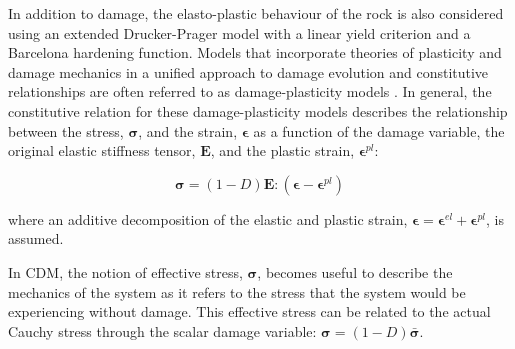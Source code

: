 In addition to damage, the elasto-plastic behaviour of the rock is also considered using an extended Drucker-Prager model with a linear yield criterion and a Barcelona hardening function. Models that incorporate theories of plasticity and damage mechanics in a unified approach to damage evolution and constitutive relationships are often referred to as damage-plasticity models \citep{zhang_continuum_2010}. In general, the constitutive relation for these damage-plasticity models describes the relationship between the stress, $\boldsymbol{\sigma}$, and the strain, $\boldsymbol{\epsilon}$ as a function of the damage variable, the original elastic stiffness tensor, $\mathbf{E}$, and the plastic strain, $\boldsymbol{\epsilon}^{pl}$: 

\begin{equation}
\boldsymbol{\sigma}=\left(1-D\right)\mathbf{E}:\left(\boldsymbol{\epsilon}-\boldsymbol{\epsilon}^{pl}\right)
\label{eqn:const5}
\end{equation}

where an additive decomposition of the elastic and plastic strain, $\boldsymbol{\epsilon}=\boldsymbol{\epsilon}^{el}+\boldsymbol{\epsilon}^{pl}$, is assumed.

In CDM, the notion of effective stress, $\boldsymbol{\sigma}$, becomes useful to describe the mechanics of the system as it refers to the stress that the system would be experiencing without damage. This effective stress can be related to the actual Cauchy stress through the scalar damage variable: $\boldsymbol{\sigma}=\left(1-D\right)\bar{\boldsymbol{\sigma}}$.

